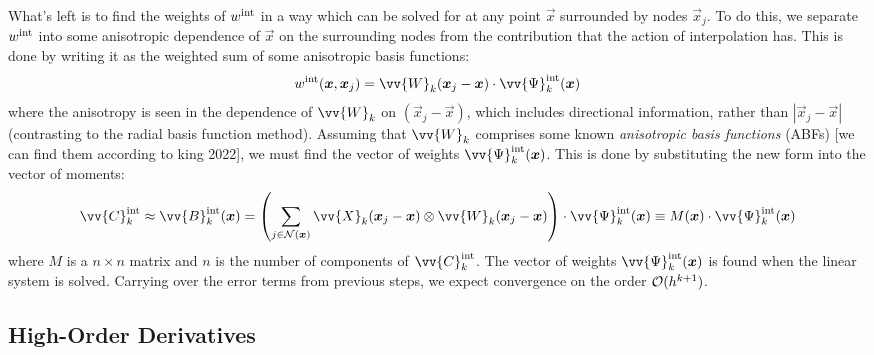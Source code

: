 What's left is to find the weights of $w^{\rm{int}}$ in a way which can be solved for at any point $\vec{x}$ surrounded by nodes $\vec{x}_j$. To do this, we separate $w^{\rm{int}}$ into some anisotropic dependence of $\vec{x}$ on the surrounding nodes from the contribution that the action of interpolation has. This is done by writing it as the weighted sum of some anisotropic basis functions:
\begin{equation}
w^{\rm{int}}(\vec{x}, \vec{x}_j) = \vv{W}_k(\vec{x}_j - \vec{x}) \cdot \vv{\Psi}_k^{\rm{int}}(\vec{x})
\end{equation}
where the anisotropy is seen in the dependence of $\vv{W}_k$ on $(\vec{x}_j - \vec{x})$, which includes directional information, rather than $|\vec{x}_j - \vec{x}|$ (contrasting to the radial basis function method). Assuming that $\vv{W}_k$ comprises some known \emph{anisotropic basis functions} (ABFs) [we can find them according to king 2022], we must find the vector of weights $\vv{\Psi}_k^{\rm{int}}(\vec{x})$. This is done by substituting the new form into the vector of moments:
\begin{align}
\vv{C}_k^\rm{int}
\approx \vv{B}_k^{\rm{int}}(\vec{x})
= \left( \sum_{j \in \cl{N}(\vec{x})} \vv{X}_k (\vec{x}_j - \vec{x}) \otimes \vv{W}_k(\vec{x}_j - \vec{x}) \right) \cdot \vv{\Psi}_k^{\rm{int}}(\vec{x})
\equiv M(\vec{x}) \cdot \vv{\Psi}_k^{\rm{int}}(\vec{x})
\end{align}
where $M$ is a $n \times n$ matrix and $n$ is the number of components of $\vv{C}_k^\rm{int}$. The vector of weights $\vv{\Psi}_k^{\rm{int}}(\vec{x})$ is found when the linear system is solved. Carrying over the error terms from previous steps, we expect convergence on the order $\cl{O}(h^{k + 1})$.






\subsection{High-Order Derivatives}

